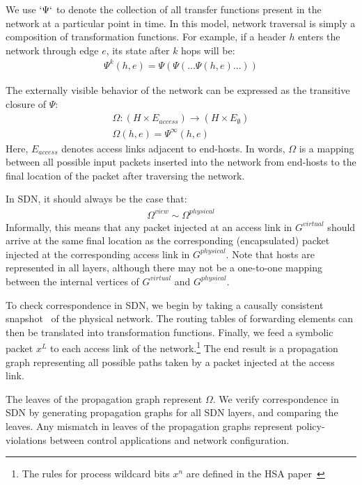 We use $`\Psi`$ to denote the collection of all transfer functions present in
the network at a particular point in time. In this model, network traversal is simply a composition of transformation
functions. For example, if a header $h$ enters the network through edge
$e$, its state after $k$ hops will be:
\begin{align*}
\Psi^k(h,e) = \Psi(\Psi(\dots \Psi(h,e)\dots))
\end{align*}

The externally visible behavior of the network can be expressed as the
transitive closure of $\Psi$:
\begin{align*}
\Omega: (H \times E_{access}) \rightarrow (H \times E_{\emptyset}) \\
\Omega(h,e) = \Psi^{\infty}(h,e)
\end{align*}
Here, $E_{access}$ denotes access links adjacent to end-hosts.
In words, $\Omega$ is a mapping between all possible input packets inserted
into the network from end-hosts to the final location of the packet after
traversing the network.

In SDN, it should always be the case that:
\begin{align*}
\Omega^{view} \sim \Omega^{physical}
\end{align*}
Informally, this means that any packet injected at an access link in $G^{virtual}$ should arrive at
the same final location as the corresponding (encapsulated) packet injected at the
corresponding access link in $G^{physical}$. Note that hosts are represented
in all layers, although there may not be a one-to-one mapping between the
internal vertices of $G^{virtual}$ and $G^{physical}$.

To check correspondence in SDN, we begin by taking a causally consistent
snapshot~\cite{Chandy:1985:DSD:214451.214456} of the physical network. The routing
tables of forwarding elements can then be translated into transformation functions.
Finally, we feed a symbolic packet $x^L$ to each access link of the
network.\footnote{The rules for process wildcard bits $x^n$ are defined in
the HSA paper~\cite{hsa}} The end result is a propagation graph representing all possible paths taken by a packet injected
at the access link.

The leaves of the propagation graph represent $\Omega$. We
verify correspondence in SDN by generating propagation graphs for all SDN layers,
and comparing the leaves. Any mismatch in leaves of the propagation graphs
represent policy-violations between control applications and network
configuration.

